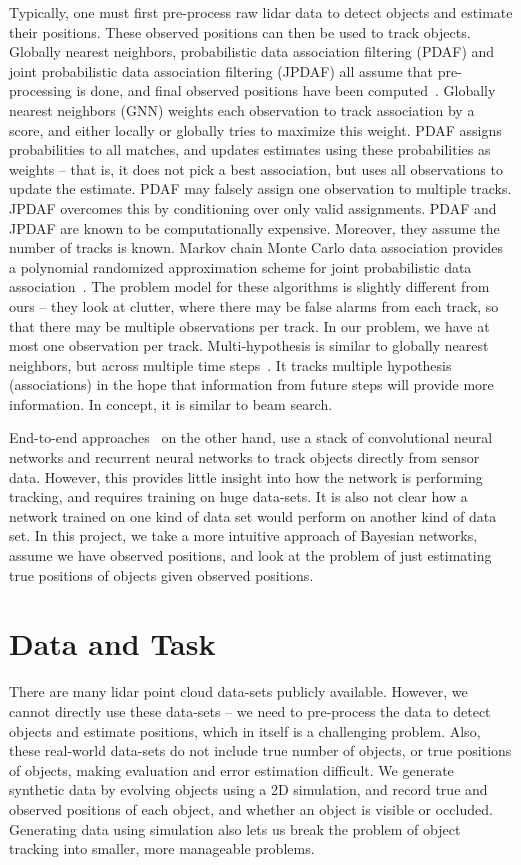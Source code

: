 \documentclass[a4paper]{article}
\begin{document}
Typically, one must first pre-process raw lidar data to detect objects and
estimate their positions.
These observed positions can then be used to track objects.
Globally nearest neighbors,
probabilistic data association filtering (PDAF) and joint probabilistic data association
filtering (JPDAF) all assume that pre-processing is done, and final observed positions have
been computed~\cite{pdaf}.
Globally nearest neighbors (GNN) weights each observation to track association by a score,
and either locally or globally tries to maximize this weight.
PDAF assigns probabilities to all matches, and updates estimates using these probabilities
as weights -- that is, it does not pick a best association, but uses all observations to
update the estimate.
PDAF may falsely assign one observation to multiple tracks. JPDAF overcomes this by
conditioning over only valid assignments.
PDAF and JPDAF are known to be computationally expensive.
Moreover, they assume the number of tracks is known.
Markov chain Monte Carlo data association provides a polynomial randomized approximation
scheme for joint probabilistic data association~\cite{mcmcda}.
The problem model for these algorithms is slightly different from ours --
they look at clutter, where there may be false alarms from each track, so that there
may be multiple observations per track.
In our problem, we have at most one observation per track.
Multi-hypothesis is similar to globally nearest neighbors, but across multiple time
steps~\cite{mht}. It tracks multiple hypothesis (associations) in the hope that
information from future steps will provide more information.
In concept, it is similar to beam search.

End-to-end approaches~\cite{deeptracking} on the other hand, use a stack of
convolutional neural networks and recurrent neural networks to track objects
directly from sensor data.
However, this provides little insight into how the network is performing tracking,
and requires training on huge data-sets.
It is also not clear how a network trained on one kind of data set would perform on
another kind of data set.
In this project, we take a more intuitive approach of Bayesian networks,
assume we have observed positions, and look at the problem
of just estimating true positions of objects given observed positions.


\section{Data and Task}

There are many lidar point cloud data-sets publicly available.
However, we cannot directly use these data-sets -- we need to pre-process
the data to detect objects and estimate positions, which in itself is a
challenging problem.
Also, these real-world data-sets do not include true number of objects,
or true positions of objects, making evaluation and error estimation
difficult.
We generate synthetic data by evolving objects using a 2D simulation, and
record true and observed positions of each object, and whether an object
is visible or occluded.
Generating data using simulation also  lets us break the problem of object
tracking into smaller, more manageable problems.
\end{document}
